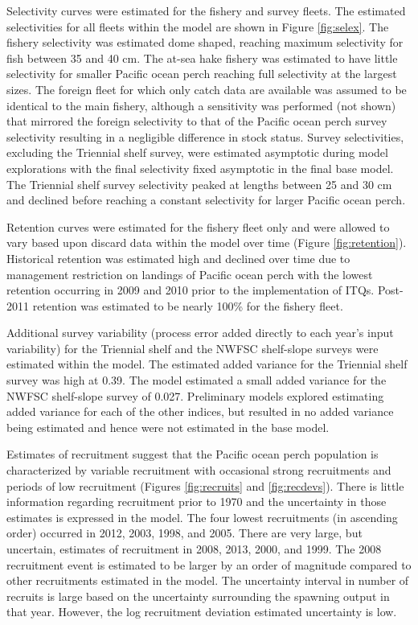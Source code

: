 \documentclass[12pt,]{article}
\begin{document}
Selectivity curves were estimated for the fishery and survey fleets. The
estimated selectivities for all fleets within the model are shown in
Figure \ref{fig:selex}. The fishery selectivity was estimated dome
shaped, reaching maximum selectivity for fish between 35 and 40 cm. The
at-sea hake fishery was estimated to have little selectivity for smaller
Pacific ocean perch reaching full selectivity at the largest sizes. The
foreign fleet for which only catch data are available was assumed to be
identical to the main fishery, although a sensitivity was performed (not
shown) that mirrored the foreign selectivity to that of the Pacific
ocean perch survey selectivity resulting in a negligible difference in
stock status. Survey selectivities, excluding the Triennial shelf
survey, were estimated asymptotic during model explorations with the
final selectivity fixed asymptotic in the final base model. The
Triennial shelf survey selectivity peaked at lengths between 25 and 30
cm and declined before reaching a constant selectivity for larger
Pacific ocean perch.

Retention curves were estimated for the fishery fleet only and were
allowed to vary based upon discard data within the model over time
(Figure \ref{fig:retention}). Historical retention was estimated high
and declined over time due to management restriction on landings of
Pacific ocean perch with the lowest retention occurring in 2009 and 2010
prior to the implementation of ITQs. Post-2011 retention was estimated
to be nearly 100\% for the fishery fleet.

Additional survey variability (process error added directly to each
year's input variability) for the Triennial shelf and the NWFSC
shelf-slope surveys were estimated within the model. The estimated added
variance for the Triennial shelf survey was high at 0.39. The model
estimated a small added variance for the NWFSC shelf-slope survey of
0.027. Preliminary models explored estimating added variance for each of
the other indices, but resulted in no added variance being estimated and
hence were not estimated in the base model.

Estimates of recruitment suggest that the Pacific ocean perch population
is characterized by variable recruitment with occasional strong
recruitments and periods of low recruitment (Figures \ref{fig:recruits}
and \ref{fig:recdevs}). There is little information regarding
recruitment prior to 1970 and the uncertainty in those estimates is
expressed in the model. The four lowest recruitments (in ascending
order) occurred in 2012, 2003, 1998, and 2005. There are very large, but
uncertain, estimates of recruitment in 2008, 2013, 2000, and 1999. The
2008 recruitment event is estimated to be larger by an order of
magnitude compared to other recruitments estimated in the model. The
uncertainty interval in number of recruits is large based on the
uncertainty surrounding the spawning output in that year. However, the
log recruitment deviation estimated uncertainty is low.
\end{document}
